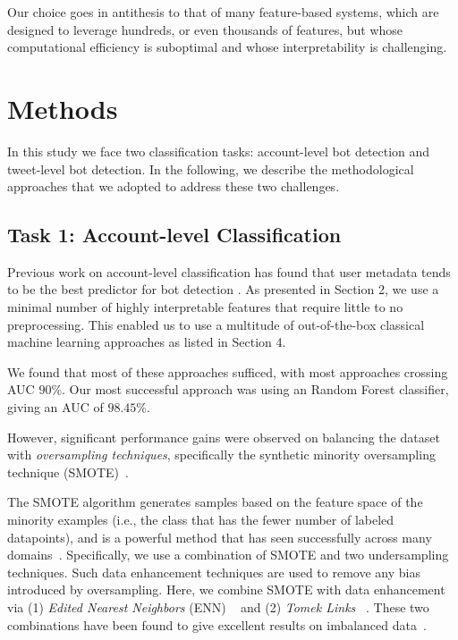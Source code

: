 Our choice goes in antithesis to that of many feature-based systems, which are designed to leverage hundreds, or even thousands of features, but whose computational efficiency is suboptimal and whose interpretability is challenging. 

\section{Methods}

In this study we face two classification tasks: account-level bot detection and tweet-level bot detection. In the following, we describe the methodological approaches that we adopted to address these two challenges.

\subsection{Task 1: Account-level Classification}

Previous work on account-level classification has found that user metadata tends to be the best predictor for bot detection \cite{ferrara2017disinformation}. As presented in Section 2, we use a minimal number of highly interpretable features that require little to no preprocessing. This enabled us to use a multitude of out-of-the-box classical machine learning approaches as listed in Section 4. 

We found that most of these approaches sufficed, with most approaches crossing AUC $90\%$. Our most successful approach was using an Random Forest classifier, giving an AUC of $98.45\%$. \par 

However, significant performance gains were observed on balancing the dataset with \textit{oversampling techniques}, specifically the synthetic minority oversampling technique (SMOTE)~\cite{chawla2002smote}. 

The SMOTE algorithm generates samples based on the feature space of the minority examples (i.e., the class that has the fewer number of labeled datapoints), and  is a powerful method that has seen successfully across many domains~\cite{he2009learning}. Specifically, we use a combination of SMOTE and two undersampling techniques. Such data enhancement techniques are used to remove any bias introduced by oversampling. Here, we combine SMOTE with data enhancement via (1) \textit{Edited Nearest Neighbors} (ENN) ~\cite{wilson1972asymptotic} and (2) \textit{Tomek Links} ~\cite{tomek1976two}. These two combinations have been found to give excellent results on imbalanced data~\cite{batista2004study}. 

